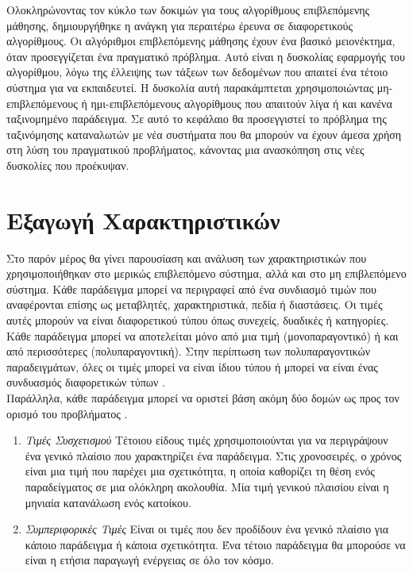 Ολοκληρώνοντας τον κύκλο των δοκιμών για τους αλγορίθμους επιβλεπόμενης μάθησης, δημιουργήθηκε η ανάγκη για περαιτέρω έρευνα σε διαφορετικούς αλγορίθμους. Οι αλγόριθμοι επιβλεπόμενης μάθησης έχουν ένα βασικό μειονέκτημα, όταν προσεγγίζεται ένα πραγματικό πρόβλημα. Αυτό είναι η δυσκολίας εφαρμογής του αλγορίθμου, λόγω της έλλειψης των τάξεων των δεδομένων που απαιτεί ένα τέτοιο σύστημα για να εκπαιδευτεί. Η δυσκολία αυτή παρακάμπτεται χρησιμοποιώντας μη-επιβλεπόμενους ή ημι-επιβλεπόμενους αλγορίθμους που απαιτούν λίγα ή και κανένα ταξινομημένο παράδειγμα. Σε αυτό το κεφάλαιο θα προσεγγιστεί το πρόβλημα της ταξινόμησης καταναλωτών με νέα συστήματα που θα μπορούν να έχουν άμεσα χρήση στη λύση του πραγματικού προβλήματος, κάνοντας μια ανασκόπηση στις νέες δυσκολίες που προέκυψαν.
\section{Εξαγωγή Χαρακτηριστικών}
Στο παρόν μέρος θα γίνει παρουσίαση και ανάλυση των χαρακτηριστικών που χρησιμοποιήθηκαν στο μερικώς επιβλεπόμενο σύστημα, αλλά και στο μη επιβλεπόμενο σύστημα. Κάθε παράδειγμα μπορεί να περιγραφεί από ένα συνδιασμό τιμών που αναφέρονται επίσης ως μεταβλητές, χαρακτηριστικά, πεδία ή διαστάσεις. Οι τιμές αυτές μπορούν να είναι διαφορετικού τύπου όπως συνεχείς, δυαδικές ή κατηγορίες. Κάθε παράδειγμα μπορεί να αποτελείται μόνο από μια τιμή (μονοπαραγοντικό) ή και από περισσότερες (πολυπαραγοντική). Στην περίπτωση των πολυπαραγοντικών παραδειγμάτων, όλες οι τιμές μπορεί να είναι ίδιου τύπου ή μπορεί να είναι ένας συνδυασμός διαφορετικών τύπων \cite{Anomaly}.\\
Παράλληλα, κάθε παράδειγμα μπορεί να οριστεί βάση ακόμη δύο δομών ως προς τον ορισμό του προβλήματος \cite{Anomaly}.
\begin{enumerate}
\item{\textit{Τιμές Συσχετισμού}} Τέτοιου είδους τιμές χρησιμοποιούνται για να περιγράψουν ένα γενικό πλαίσιο που χαρακτηρίζει ένα παράδειγμα. Στις χρονοσειρές, ο χρόνος είναι μια τιμή που παρέχει μια σχετικότητα, η οποία καθορίζει τη θέση ενός παραδείγματος σε μια ολόκληρη ακολουθία. Μία τιμή γενικού πλαισίου είναι η μηνιαία κατανάλωση ενός κατοίκου.
\item{\textit{Συμπεριφορικές Τιμές}} Είναι οι τιμές που δεν προδίδουν ένα γενικό πλαίσιο για κάποιο παράδειγμα ή κάποια σχετικότητα. Ένα τέτοιο παράδειγμα θα μπορούσε να είναι η ετήσια παραγωγή ενέργειας σε όλο τον κόσμο.
\end{enumerate}
